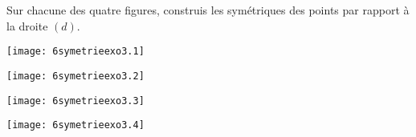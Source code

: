 Sur chacune des quatre figures, construis les symétriques des points par rapport à la droite $(d)$.
\begin{multicols}{4}
   \par\texttt{[image: 6symetrieexo3.1]}
   \par\texttt{[image: 6symetrieexo3.2]}
   \par\texttt{[image: 6symetrieexo3.3]}
   \par\texttt{[image: 6symetrieexo3.4]}
\end{multicols}
